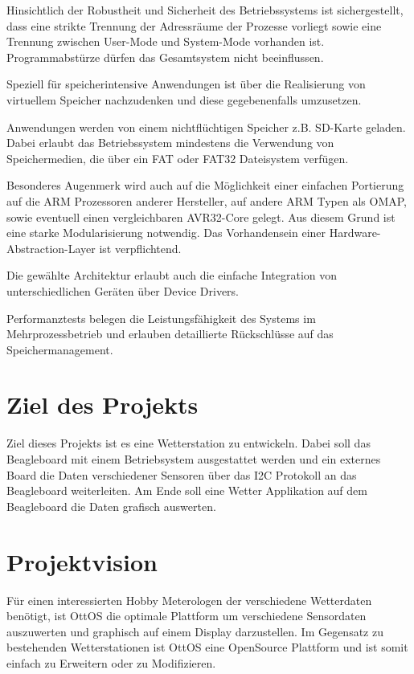 \documentclass[10pt,a4paper,fleqn]{article}
\begin{document}
	Hinsichtlich der Robustheit und Sicherheit des Betriebssystems ist sichergestellt, dass
		eine strikte Trennung der Adressräume der Prozesse vorliegt sowie eine Trennung zwischen
		User-Mode und System-Mode vorhanden ist. Programmabstürze dürfen das Gesamtsystem nicht
		beeinflussen.
		
	Speziell für speicherintensive Anwendungen ist über die Realisierung von virtuellem Speicher
		nachzudenken und diese gegebenenfalls umzusetzen.
		
	Anwendungen werden von einem nichtflüchtigen Speicher z.B. SD-Karte geladen. Dabei erlaubt
		das Betriebssystem mindestens die Verwendung von Speichermedien, die über ein FAT
		oder FAT32 Dateisystem verfügen.
	
	Besonderes Augenmerk wird auch auf die Möglichkeit einer einfachen Portierung auf die ARM
		Prozessoren anderer Hersteller, auf andere ARM Typen als OMAP, sowie eventuell einen
		vergleichbaren AVR32-Core gelegt. Aus diesem Grund ist eine starke Modularisierung
		notwendig. Das Vorhandensein einer Hardware-Abstraction-Layer ist verpflichtend.
		
	Die gewählte Architektur erlaubt auch die einfache Integration von unterschiedlichen
		Geräten über Device Drivers.
			
	Performanztests belegen die Leistungsfähigkeit des Systems im Mehrprozessbetrieb und erlauben
		detaillierte Rückschlüsse auf das Speichermanagement.

\section{Ziel des Projekts}
 	Ziel dieses Projekts ist es eine Wetterstation zu entwickeln. Dabei soll das Beagleboard mit
		einem Betriebsystem ausgestattet werden und ein externes Board die Daten verschiedener
		Sensoren über das I2C Protokoll an das Beagleboard weiterleiten. Am Ende soll eine Wetter
		Applikation auf dem Beagleboard die Daten grafisch auswerten.

\section{Projektvision}
	Für einen interessierten Hobby Meterologen der verschiedene Wetterdaten benötigt, ist OttOS die
		optimale Plattform um verschiedene Sensordaten auszuwerten und graphisch auf einem Display
		darzustellen. Im Gegensatz zu bestehenden Wetterstationen ist OttOS eine OpenSource
		Plattform und ist somit einfach zu Erweitern oder zu Modifizieren.
\end{document}
